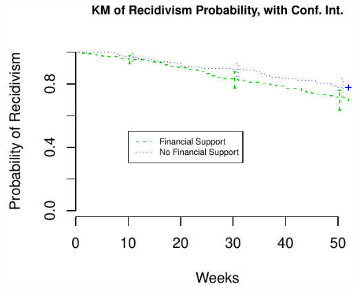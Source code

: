 \documentclass[ignorenonframetext,]{beamer}
\begin{document}
\begin{frame}

\includegraphics{unit_02_estimation_files/figure-beamer/unnamed-chunk-6-1.pdf}

\end{frame}
\end{document}
